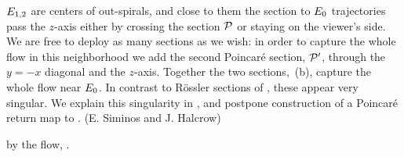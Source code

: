 {    
$E_{1,2}$ are centers of out-spirals, and close to them  the
section %
to  $E_{0}$ trajectories pass the $z$-axis either by crossing
the section ${\cal P}$ or staying on the viewer's side. We are
free to deploy as many sections as we wish: in order to capture
the whole flow in this neighborhood we add the second
Poincar\'e section, ${\cal P}'$, through the $y=-x$ diagonal and
the $z$-axis. Together the two sections,
\,(b), capture the whole flow near
$E_{0}$. In contrast to R\"ossler sections of
, these appear very singular. We explain
this singularity in , and postpone
construction of a Poincar\'e return map to
.
\hfill   (E. Siminos and J. Halcrow)
    } %


by the flow, .


